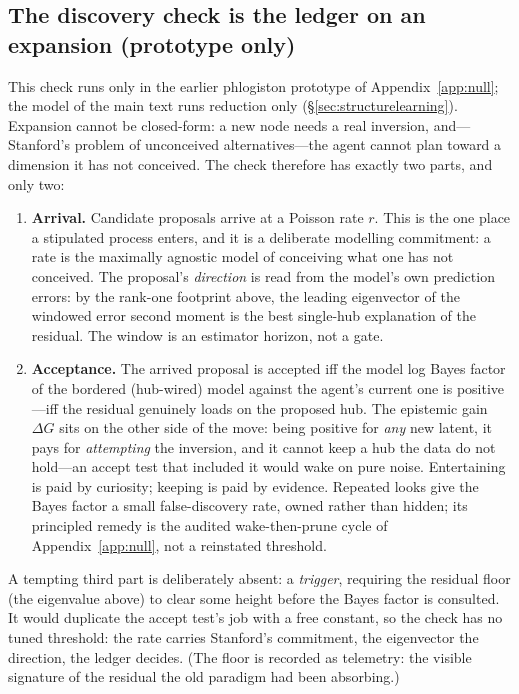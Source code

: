 \subsection{The discovery check is the ledger on an expansion (prototype only)}

This check runs only in the earlier phlogiston prototype of Appendix~\ref{app:null}; the
model of the main text runs reduction only (\S\ref{sec:structurelearning}). Expansion cannot
be closed-form: a new node needs a real inversion, and---Stanford's problem of unconceived
alternatives---the agent cannot plan toward a dimension it has not conceived. The check
therefore has exactly two parts, and only two:

\begin{enumerate}
\item \textbf{Arrival.} Candidate proposals arrive at a Poisson rate $r$. This is the one
place a stipulated process enters, and it is a deliberate modelling commitment: a rate is the
maximally agnostic model of conceiving what one has not conceived. The proposal's
\emph{direction} is read from the model's own prediction errors: by the rank-one footprint
above, the leading eigenvector of the windowed error second moment is the best single-hub
explanation of the residual. The window is an estimator horizon, not a gate.
\item \textbf{Acceptance.} The arrived proposal is accepted iff the model log Bayes factor of
the bordered (hub-wired) model against the agent's current one is positive---iff the residual
genuinely loads on the proposed hub. The epistemic gain $\Delta G$ sits on the other side of
the move: being positive for \emph{any} new latent, it pays for \emph{attempting} the
inversion, and it cannot keep a hub the data do not hold---an accept test that included it
would wake on pure noise. Entertaining is paid by curiosity; keeping is paid by evidence.
Repeated looks give the Bayes factor a small false-discovery rate, owned rather than hidden;
its principled remedy is the audited wake-then-prune cycle of Appendix~\ref{app:null}, not a
reinstated threshold.
\end{enumerate}

A tempting third part is deliberately absent: a \emph{trigger}, requiring the residual floor
(the eigenvalue above) to clear some height before the Bayes factor is consulted. It would
duplicate the accept test's job with a free constant, so the check has no tuned threshold:
the rate carries Stanford's commitment, the eigenvector the direction, the ledger decides.
(The floor is recorded as telemetry: the visible signature of the residual the old paradigm
had been absorbing.)

